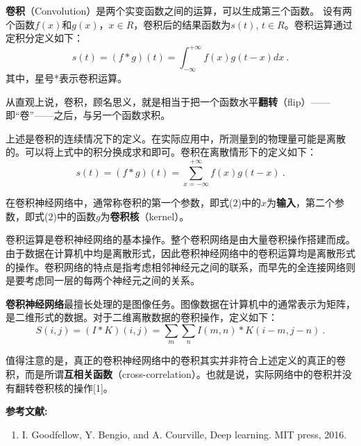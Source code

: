 


\textbf{卷积}（Convolution）是两个实变函数之间的运算，可以生成第三个函数。
设有两个函数$f(x)$和$g(x)$，$x \in R$，卷积后的结果函数为$s(t)$, $t \in R$。卷积运算通过定积分定义如下：
\begin{equation}
s(t) = (f*g)(t) = \int_{ - \infty }^{ + \infty } {f(x)g(t - x)dx}~.
\end{equation}
其中，星号*表示卷积运算。

从直观上说，卷积，顾名思义，就是相当于把一个函数水平\textbf{翻转}（flip）——即“卷”——之后，与另一个函数求积。

上述是卷积的连续情况下的定义。在实际应用中，所测量到的物理量可能是离散的。可以将上式中的积分换成求和即可。卷积在离散情形下的定义如下：
\begin{equation}
s(t) = (f*g)(t) = \sum_{ x = - \infty }^{ + \infty } {f(x)g(t - x)}~.
\end{equation}

在卷积神经网络中，通常称卷积的第一个参数，即式($2$)中的$x$为\textbf{输入}，第二个参数，即式($2$)中的函数$g$为\textbf{卷积核}（kernel）。

卷积运算是卷积神经网络的基本操作。整个卷积网络是由大量卷积操作搭建而成。由于数据在计算机中均是离散形式，因此卷积神经网络中的卷积运算均是离散形式的操作。卷积网络的特点是指考虑相邻神经元之间的联系，而早先的全连接网络则是要考虑同一层的每两个神经元之间的关系。

\textbf{卷积神经网络}最擅长处理的是图像任务。图像数据在计算机中的通常表示为矩阵，是二维形式的数据。对于二维离散数据的卷积操作，定义如下：
\begin{equation}
S(i,j) = (I*K)(i,j) = \sum_{m}\sum_{n}I(m,n)*K(i-m,j-n)~.
\end{equation}

值得注意的是，真正的卷积神经网络中的卷积其实并非符合上述定义的真正的卷积，而是所谓\textbf{互相关函数}（cross-correlation）。也就是说，实际网络中的卷积并没有翻转卷积核的操作[1]。


\textbf{参考文献:}
\begin{enumerate}
\item I. Goodfellow, Y. Bengio, and A. Courville, Deep learning. MIT press, 2016.
\end{enumerate}
